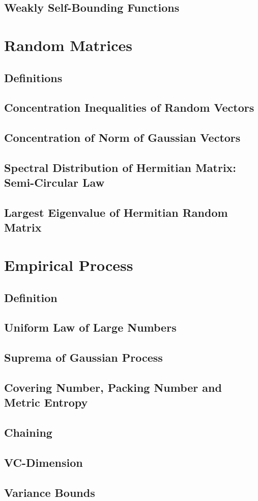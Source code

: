 \documentclass[11pt]{article}
\begin{document}
\subsection{Weakly Self-Bounding Functions}


\section{Random Matrices}
\subsection{Definitions}
\subsection{Concentration Inequalities of Random Vectors}
\subsection{Concentration of Norm of Gaussian Vectors}
\subsection{Spectral Distribution of Hermitian Matrix: Semi-Circular Law}
\subsection{Largest Eigenvalue of  Hermitian Random Matrix}


\section{Empirical Process}
\subsection{Definition}
\subsection{Uniform Law of Large Numbers}
\subsection{Suprema of Gaussian Process}
\subsection{Covering Number, Packing Number and Metric Entropy}
\subsection{Chaining}
\subsection{VC-Dimension}
\subsection{Variance Bounds}




\newpage


\end{document}
